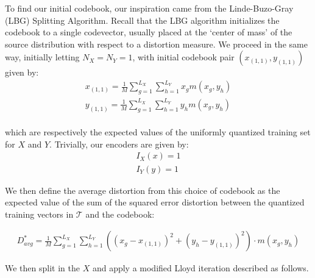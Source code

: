 To find our initial codebook, our inspiration came from the Linde-Buzo-Gray (LBG) Splitting Algorithm. Recall that the LBG algorithm initializes the codebook to a single codevector, usually placed at the `center of mass' of the source distribution with respect to a distortion measure. We proceed in the same way, initially letting $N_X=N_Y=1$, with initial codebook pair $(x_{(1,1)},y_{(1,1)})$ given by: \\

\begin{align}
    x_{(1,1)} = \frac{1}{M}\sum_{g=1}^{L_X}\sum_{h=1}^{L_Y}x_g m(x_g, y_h)\\
    y_{(1,1)} = \frac{1}{M}\sum_{g=1}^{L_X}\sum_{h=1}^{L_Y}y_h m(x_g, y_h)
\end{align}
\\
which are respectively the expected values of the uniformly quantized training set for $X$ and $Y$. Trivially, our encoders are given by:\\

\begin{align}
    I_X(x) = 1\\
    I_Y(y) = 1
\end{align}

We then define the average distortion from this choice of codebook as the expected value of the sum of the squared error distortion between the quantized training vectors in $\mathcal T$ and the codebook:

\begin{align}
    D_{avg}^* = \frac{1}{M}\sum_{g=1}^{L_X}\sum_{h=1}^{L_Y}((x_g-x_{(1,1)})^2+(y_h-y_{(1,1)})^2)\cdot m(x_g,y_h)
\end{align}

We then split in the $X$ and apply a modified Lloyd iteration described as follows.\\

